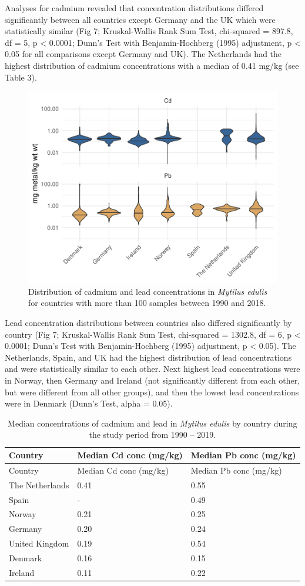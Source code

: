 \documentclass[
  12pt,
]{article}
\begin{document}
Analyses for cadmium revealed that concentration distributions differed
significantly between all countries except Germany and the UK which were
statistically similar (Fig 7; Kruskal-Wallis Rank Sum Test, chi-squared
= 897.8, df = 5, p \textless{} 0.0001; Dunn's Test with
Benjamin-Hochberg (1995) adjustment, p \textless{} 0.05 for all
comparisons except Germany and UK). The Netherlands had the highest
distribution of cadmium concentrations with a median of 0.41 mg/kg (see
Table 3).

\begin{figure}
\centering
\includegraphics{McCrory_ENV972_Project_files/figure-latex/unnamed-chunk-8-1.pdf}
\caption{Distribution of cadmium and lead concentrations in
\emph{Mytilus edulis} for countries with more than 100 samples between
1990 and 2018.}
\end{figure}

Lead concentration distributions between countries also differed
significantly by country (Fig 7; Kruskal-Wallis Rank Sum Test,
chi-squared = 1302.8, df = 6, p \textless{} 0.0001; Dunn's Test with
Benjamin-Hochberg (1995) adjustment, p \textless{} 0.05). The
Netherlands, Spain, and UK had the highest distribution of lead
concentrations and were statistically similar to each other. Next
highest lead concentrations were in Norway, then Germany and Ireland
(not significantly different from each other, but were different from
all other groups), and then the lowest lead concentrations were in
Denmark (Dunn's Test, alpha = 0.05).

\begin{longtable}[]{@{}lll@{}}
\caption{Median concentrations of cadmium and lead in \emph{Mytilus
edulis} by country during the study period from 1990 --
2019.}\tabularnewline
\toprule
Country & Median Cd conc (mg/kg) & Median Pb conc (mg/kg)\tabularnewline
\midrule
\endfirsthead
\toprule
Country & Median Cd conc (mg/kg) & Median Pb conc (mg/kg)\tabularnewline
\midrule
\endhead
The Netherlands & 0.41 & 0.55\tabularnewline
Spain & - & 0.49\tabularnewline
Norway & 0.21 & 0.25\tabularnewline
Germany & 0.20 & 0.24\tabularnewline
United Kingdom & 0.19 & 0.54\tabularnewline
Denmark & 0.16 & 0.15\tabularnewline
Ireland & 0.11 & 0.22\tabularnewline
\bottomrule
\end{longtable}
\end{document}
